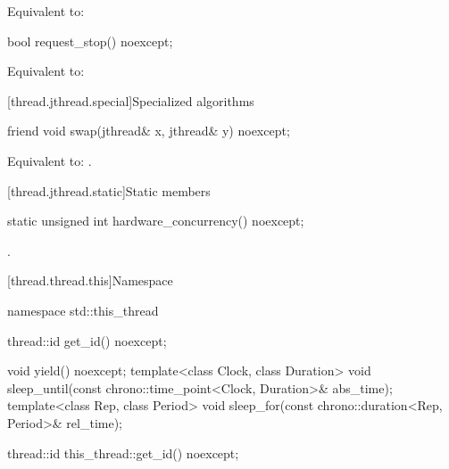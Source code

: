 \begin{itemdescr}
\pnum
\effects
Equivalent to: 
\end{itemdescr}

%
\begin{itemdecl}
bool request_stop() noexcept;
\end{itemdecl}

\begin{itemdescr}
\pnum
\effects
Equivalent to: 
\end{itemdescr}


[thread.jthread.special]{Specialized algorithms}

%
\begin{itemdecl}
friend void swap(jthread& x, jthread& y) noexcept;
\end{itemdecl}

\begin{itemdescr}
\pnum
\effects
Equivalent to: .
\end{itemdescr}

[thread.jthread.static]{Static members}

%
\begin{itemdecl}
static unsigned int hardware_concurrency() noexcept;
\end{itemdecl}

\begin{itemdescr}
\pnum
\returns
{}.
\end{itemdescr}


[thread.thread.this]{Namespace }

\begin{codeblock}
namespace std::this_thread {
  thread::id get_id() noexcept;

  void yield() noexcept;
  template<class Clock, class Duration>
    void sleep_until(const chrono::time_point<Clock, Duration>& abs_time);
  template<class Rep, class Period>
    void sleep_for(const chrono::duration<Rep, Period>& rel_time);
}
\end{codeblock}

%
\begin{itemdecl}
thread::id this_thread::get_id() noexcept;
\end{itemdecl}

